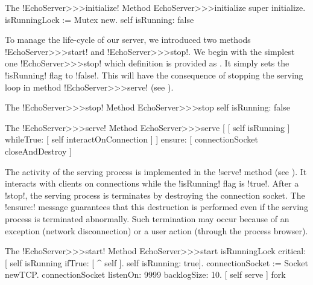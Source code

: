 \documentclass[a4paper,10pt,twoside]{book}
\begin{document}
\begin{method}{The \ct!EchoServer>>>initialize! Method}
EchoServer>>>initialize 
	super initialize.
	isRunningLock := Mutex new.
	self isRunning: false
\end{method}

To manage the life-cycle of our server, we introduced two methods \ct!EchoServer>>>start! and \ct!EchoServer>>>stop!.
We begin with the simplest one \ct!EchoServer>>>stop! which definition is provided as .
It simply sets the \ct!isRunning! flag to \ct!false!.
This will have the consequence of stopping the serving loop in method \ct!EchoServer>>>serve! (see ). 

\begin{method}{The \ct!EchoServer>>>stop! Method}
EchoServer>>>stop
	self isRunning: false
\end{method}

\begin{method}{The \ct!EchoServer>>>serve! Method}
EchoServer>>>serve
	[ [ self isRunning ]
		whileTrue: [ self interactOnConnection ] ]
		ensure: [ connectionSocket closeAndDestroy ]
\end{method}

The activity of the serving process is implemented in the \ct!serve! method (see ).
It interacts with clients on connections while the \ct!isRunning! flag is \ct!true!.
After a \ct!stop!, the serving process is terminates by destroying the connection socket.
The \ct!ensure:! message guarantees that this destruction is performed even if the serving process is terminated abnormally. 
Such termination may occur because of an exception (\eg network disconnection) or a user action (\eg through the process browser).   

\begin{method}{The \ct!EchoServer>>>start! Method}
EchoServer>>>start
	isRunningLock critical: [
		self isRunning ifTrue: [ ^ self ].
		self isRunning: true].
	connectionSocket := Socket newTCP.
	connectionSocket listenOn: 9999 backlogSize: 10.
	[ self serve ] fork
\end{method}
\end{document}

